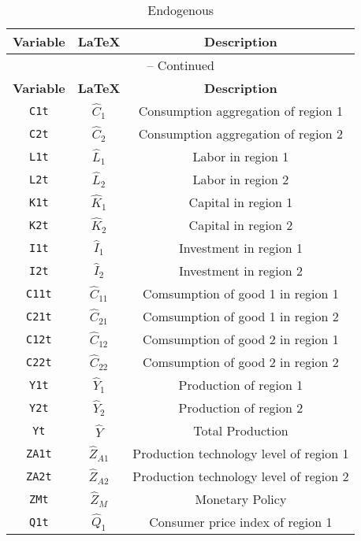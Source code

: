 \begin{center}
\begin{longtable}{ccc}
\caption{Endogenous}\\%
\hline%
\multicolumn{1}{c}{\textbf{Variable}} &
\multicolumn{1}{c}{\textbf{\LaTeX}} &
\multicolumn{1}{c}{\textbf{Description}}\\%
\hline\hline%
\endfirsthead
\multicolumn{3}{c}{{\tablename} \thetable{} -- Continued}\\%
\hline%
\multicolumn{1}{c}{\textbf{Variable}} &
\multicolumn{1}{c}{\textbf{\LaTeX}} &
\multicolumn{1}{c}{\textbf{Description}}\\%
\hline\hline%
\endhead
\texttt{C1t} & ${\hat{C}_{1}}$ & Consumption aggregation of region 1\\
\texttt{C2t} & ${\hat{C}_{2}}$ & Consumption aggregation of region 2\\
\texttt{L1t} & ${\hat{L}_{1}}$ & Labor in region 1\\
\texttt{L2t} & ${\hat{L}_{2}}$ & Labor in region 2\\
\texttt{K1t} & ${\hat{K}_{1}}$ & Capital in region 1\\
\texttt{K2t} & ${\hat{K}_{2}}$ & Capital in region 2\\
\texttt{I1t} & ${\hat{I}_{1}}$ & Investment in region 1\\
\texttt{I2t} & ${\hat{I}_{2}}$ & Investment in region 2\\
\texttt{C11t} & ${\hat{C}_{11}}$ & Comsumption of good 1 in region 1\\
\texttt{C21t} & ${\hat{C}_{21}}$ & Comsumption of good 1 in region 2\\
\texttt{C12t} & ${\hat{C}_{12}}$ & Comsumption of good 2 in region 1\\
\texttt{C22t} & ${\hat{C}_{22}}$ & Comsumption of good 2 in region 2\\
\texttt{Y1t} & ${\hat{Y}_{1}}$ & Production of region 1\\
\texttt{Y2t} & ${\hat{Y}_{2}}$ & Production of region 2\\
\texttt{Yt} & ${\hat{Y}}$ & Total Production\\
\texttt{ZA1t} & ${\hat{Z}_{A1}}$ & Production technology level of region 1\\
\texttt{ZA2t} & ${\hat{Z}_{A2}}$ & Production technology level of region 2\\
\texttt{ZMt} & ${\hat{Z}_M}$ & Monetary Policy\\
\texttt{Q1t} & ${\hat{Q}_{1}}$ & Consumer price index of region 1\\

\end{longtable}
\end{center}
